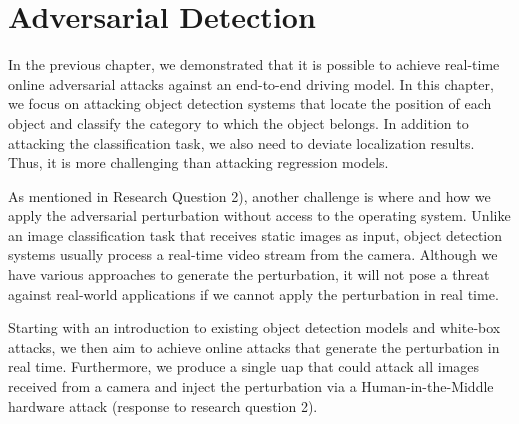 \chapter{Adversarial Detection}
\label{chpt:detection}


In the previous chapter, we demonstrated that it is possible to achieve real-time online adversarial attacks against an end-to-end driving model. In this chapter, we focus on attacking object detection systems that locate the position of each object and classify the category to which the object belongs. In addition to attacking the classification task, we also need to deviate localization results. Thus, it is more challenging than attacking regression models.

As mentioned in Research Question 2), another challenge is where and how we apply the adversarial perturbation without access to the operating system. Unlike an image classification task that receives static images as input, object detection systems usually process a real-time video stream from the camera. Although we have various approaches to generate the perturbation, it will not pose a threat against real-world applications if we cannot apply the perturbation in real time.

Starting with an introduction to existing object detection models and white-box attacks, we then aim to achieve online attacks that generate the perturbation in real time. Furthermore, we produce a single \acrfull{uap} that could attack all images received from a camera and inject the perturbation via a Human-in-the-Middle hardware attack (response to research question 2).




